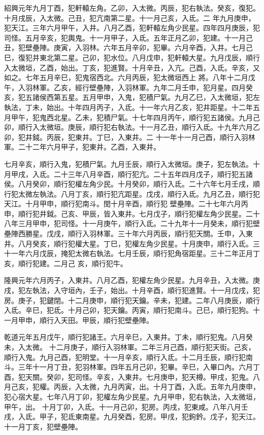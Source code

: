 \begin{pinyinscope}
 紹興元年九月丁酉，犯軒轅左角。乙卯，入太微。丙辰，犯右執法。癸亥，復犯。十月戌辰，入太微。己丑，犯亢南第二星。十一月己亥，入氐。二
 年九月庚申，犯天江。三年六月甲午，入井。八月乙酉，犯軒轅左角少民星。四年四月庚辰，犯司怪。五月辛亥，犯輿鬼。十一月甲子，入氐。五年正月乙卯，犯建。十一月己丑，犯壁壘陣。庚寅，入羽林。六年五月辛卯，犯畢。六月辛酉，入井。七月己巳，復犯井東北第二星。己卯，犯水位。八月戊申，犯軒轅大星。九月戊辰，順行入太微垣，乙酉，始出。丁亥，犯進賢。十月辛丑，入亢。己酉，入氐。辛亥，又如之。七年五月辛巳，犯鬼宿西北。六月丙辰，犯太微垣西上
 將。八年十二月戊午，入羽林軍。乙亥，經行壁壘陣，入羽林軍。九年二月壬申，犯月星。四月癸亥，犯五諸侯西第五星。五月甲申，入鬼，犯積尸氣。九月乙巳，入太微垣，犯左執法，丁未，始出。十年四月丙子，入氐。十一年六月乙亥，犯井距星。十二年五月甲午，犯鬼西北星。乙未，犯積尸氣。十七年四月丙午，順行犯五諸侯。九月己卯，順行入太微垣。庚辰，順行犯右執法。十一月乙丑，順行入氐。十九年六月乙卯，犯井鉞。丙辰，犯東井。丁巳，入東井。二
 十一年十一月己酉，順行入羽林軍。二十二年六月甲子，犯東井。乙酉，入東井。



 七月辛亥，順行入鬼，犯積尸氣。九月壬辰，順行入太微垣。庚子，犯左執法。十月甲戌，入氐。二十三年八月辛酉，順行犯亢。二十五年四月戊子，順行犯五諸侯。八月癸卯，順行犯權左角少民。十月癸卯，順行入氐。二十六年七月壬戌，順行犯太微左執法。八月丁亥，順行犯亢距星。戊戌，順行入氐。九月乙丑，順行犯天江。十月甲申，順行犯南斗。閏十月辛酉，順行犯
 壁壘陣。二十七年六月丙申，順行犯井鉞。己亥、甲辰，皆入東井。七月戊子，順行犯權左角少民星。二十八年三月甲申，犯司怪。十一月庚午，順行入氐。二十九年十一月癸未，順行犯壁壘陣西勝星。戊戌，順行入羽林軍。三十年六月丙辰，順行犯天關。壬申，入東井。八月癸亥，順行犯權大星。丁巳，犯權左角少民星。十月庚申，順行入氐。三十一年六月戊辰，掩犯太微右執法。七月壬辰，順行犯角宿距星。三十二年正月丁亥，順行犯建。二月己
 亥，順行犯牛。



 隆興元年六月丙子，入東井。八月乙酉，犯權左角少民星。九月辛丑，入太微。庚戌，犯左執法，入守垣內，壬子，始出。十月辛酉，順行犯進賢。十一月戊戌，犯房。庚子，犯鍵閉。十二月庚申，順行犯天鑰。辛未，犯建。二年八月庚辰，順行入氐。辛巳，犯氐。十月己卯，犯天鑰。丙寅，順行犯南斗。己巳，順行犯狗。十一月甲申，順行入天田。甲辰，順行犯壁壘陣。



 乾道元年五月戊午，順行犯諸王。六月辛巳，入東井。丁未，順行犯鬼。八月癸未，入太微。
 十二月庚子，順行入羽林軍。二年三月己酉，順行犯天街。己亥，順行入鬼。九月己酉，犯明堂。十一月辛亥，順行入氐。十二月壬辰，順行犯南斗。三年十一月丁丑，犯羽林軍。四年五月己卯，犯畢。辛巳，入畢口內。六月丁酉，犯天關。癸卯，犯司怪。辛亥，入東井。七月庚申，犯天樽。甲戌，犯鬼。八月己亥，犯權。丙辰，入太微，九月丙寅，出。十月丁酉，入氐。五年九月庚申，犯心宿大星。七年八月丁卯，犯權左角少民星。九月甲申，犯右執法，入太微垣，甲午，出。
 十月丁卯，入氐。十一月己卯，犯房。丙戌，犯東咸。八年八月壬戌，入氐。甲子，犯氐東南星。九月癸酉，犯房。甲戌，犯鉤鈐。戊子，犯天江。十一月丁亥，犯壁壘陣。




\end{pinyinscope}
